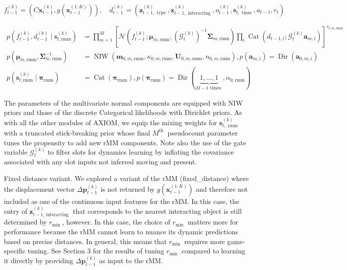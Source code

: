 \documentclass[10pt]{article}
\begin{document}
\begin{equation*}
f_{t-1}^{(k)}=\left(C \mathbf{x}_{t-1}^{(k)}, g\left(\mathbf{x}_{t-1}^{(1: K)}\right)\right), \quad d_{t-1}^{(k)}=\left(\mathbf{z}_{t-1, \text { type }}^{(k)}, \mathbf{z}_{t-1, \text { interacting }}^{(k)}, o_{t-1}^{(k)}, \mathbf{s}_{t, \text { tmm }}^{(k)}, a_{t-1}, r_{t}\right) \tag{29}
\end{equation*}



\begin{align*}
p\left(f_{t-1}^{(k)}, d_{t-1}^{(k)} \mid \mathbf{s}_{t, \mathrm{rmm}}^{(k)}\right) & =\prod_{m=1}^{M}\left[\mathcal{N}\left(f_{t-1}^{(k)} ; \boldsymbol{\mu}_{m, \mathrm{rmm}},\left(\mathcal{G}_{t}^{(k)}\right)^{-1} \boldsymbol{\Sigma}_{m, \mathrm{rmm}}\right) \prod_{i} \operatorname{Cat}\left(d_{t-1, i} ; \mathcal{G}_{t}^{(k)} \mathbf{a}_{m, i}\right)\right]^{s_{t, m, \mathrm{rmm}}} \\
p\left(\boldsymbol{\mu}_{m, \mathrm{rmm}}, \boldsymbol{\Sigma}_{m, \mathrm{rmm}}^{-1}\right) & =\operatorname{NIW}\left(\mathbf{m}_{0, m, \mathrm{rmm}}, \kappa_{0, m, \mathrm{rmm}}, \mathbf{U}_{0, m, \mathrm{rmm}}, n_{0, m, \mathrm{rmm}}\right), p\left(\mathbf{a}_{m, i}\right)=\operatorname{Dir}\left(\mathbf{a}_{0, m, i}\right)  \tag{30}\\
p\left(\mathbf{s}_{t, \mathrm{rmm}}^{(k)} \mid \boldsymbol{\pi}_{\mathrm{rmm}}\right) & =\operatorname{Cat}\left(\boldsymbol{\pi}_{\mathrm{rmm}}\right), p\left(\boldsymbol{\pi}_{\mathrm{rmm}}\right)=\operatorname{Dir}(\underbrace{1, \ldots, 1}_{M-1 \text { times }}, \alpha_{0, \mathrm{rmm}}) \tag{32}
\end{align*}


The parameters of the multivariate normal components are equipped with NIW priors and those of the discrete Categorical likelihoods with Dirichlet priors. As with all the other modules of AXIOM, we equip the mixing weights for $\mathbf{s}_{t, \text { rmm }}^{(k)}$ with a truncated stick-breaking prior whose final $M^{\text {th }}$ pseudocount parameter tunes the propensity to add new rMM components. Note also the use of the gate variable $\mathcal{G}_{t}^{(k)}$ to filter slots for dynamics learning by inflating the covariance associated with any slot inputs not inferred moving and present.

Fixed distance variant. We explored a variant of the rMM (fixed\_distance) where the displacement vector $\Delta \mathbf{p}_{t-1}^{(k)}$ is not returned by $g\left(\mathbf{x}_{t-1}^{(1: K)}\right)$ and therefore not included as one of the continuous input features for the rMM. In this case, the entry of $\mathbf{z}_{t-1 \text {, interacting }}^{(k)}$ that corresponds to the nearest interacting object is still determined by $r_{\text {min }}$, however. In this case, the choice of $r_{\text {min }}$ matters more for performance because the rMM cannot learn to nuance its dynamic predictions based on precise distances. In general, this means that $r_{\text {min }}$ requires more game-specific tuning. See Section 3 for the results of tuning $r_{\text {min }}$ compared to learning it directly by providing $\Delta \mathbf{p}_{t-1}^{(k)}$ as input to the rMM.
\end{document}
